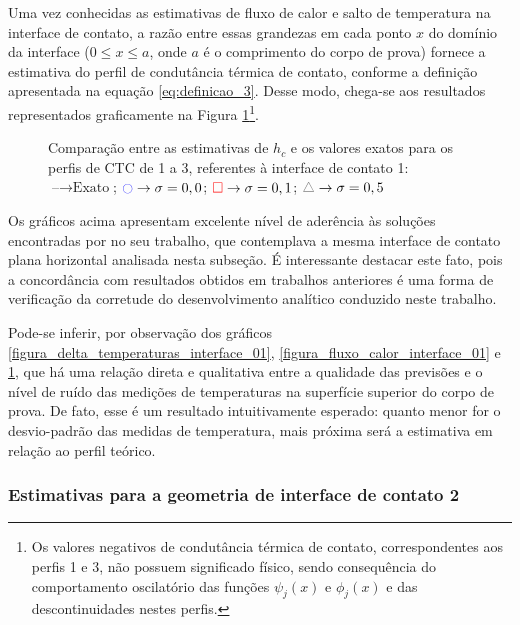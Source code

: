 Uma vez conhecidas as estimativas de fluxo de calor e salto de temperatura na interface de contato, a razão entre essas grandezas em cada ponto $x$ do domínio da interface ($0 \le x \le a$, onde $a$ é o comprimento do corpo de prova) fornece a estimativa do perfil de condutância térmica de contato, conforme a definição apresentada na equação \eqref{eq:definicao_3}. Desse modo, chega-se aos resultados representados graficamente na Figura \ref{figura_ctc_interface_01}\footnote{Os valores negativos de condutância térmica de contato, correspondentes aos perfis 1 e 3, não possuem significado físico, sendo consequência do comportamento oscilatório das funções $\psi_j(x)$ e $\phi_j(x)$ e das descontinuidades nestes perfis.}.
\begin{figure}[H]
	\caption{Comparação entre as estimativas de $h_c$ e os valores exatos para os perfis de CTC de 1 a 3, referentes à interface de contato 1: $\text{--} \rightarrow \text{Exato}$; $\textcolor{blue}{\ocircle} \rightarrow \sigma = 0,0$; $\textcolor{red}{\square} \rightarrow \sigma = 0,1$; $\textcolor{gray}{\triangle} \rightarrow \sigma = 0,5$}
	\label{figura_ctc_interface_01}
\end{figure}

Os gráficos acima apresentam excelente nível de aderência às soluções encontradas por \cite{tese_padilha} no seu trabalho, que contemplava a mesma interface de contato plana horizontal analisada nesta subseção. É interessante destacar este fato, pois a concordância com resultados obtidos em trabalhos anteriores é uma forma de verificação da corretude do desenvolvimento analítico conduzido neste trabalho.

Pode-se inferir, por observação dos gráficos \ref{figura_delta_temperaturas_interface_01}, \ref{figura_fluxo_calor_interface_01} e \ref{figura_ctc_interface_01}, que há uma relação direta e qualitativa entre a qualidade das previsões e o nível de ruído das medições de temperaturas na superfície superior do corpo de prova. De fato, esse é um resultado intuitivamente esperado: quanto menor for o desvio-padrão das medidas de temperatura, mais próxima será a estimativa em relação ao perfil teórico.

\subsubsection{Estimativas para a geometria de interface de contato 2}

